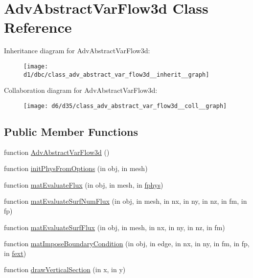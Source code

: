 \hypertarget{class_adv_abstract_var_flow3d}{}\section{Adv\+Abstract\+Var\+Flow3d Class Reference}
\label{class_adv_abstract_var_flow3d}


Inheritance diagram for Adv\+Abstract\+Var\+Flow3d\+:
\nopagebreak
\begin{figure}[H]
\begin{center}
\leavevmode
\texttt{[image: d1/dbc/class\_adv\_abstract\_var\_flow3d\_\_inherit\_\_graph]}
\end{center}
\end{figure}


Collaboration diagram for Adv\+Abstract\+Var\+Flow3d\+:
\nopagebreak
\begin{figure}[H]
\begin{center}
\leavevmode
\texttt{[image: d6/d35/class\_adv\_abstract\_var\_flow3d\_\_coll\_\_graph]}
\end{center}
\end{figure}
\subsection*{Public Member Functions}
\begin{DoxyCompactItemize}
\item 
function \hyperlink{class_adv_abstract_var_flow3d_aa5e5f21952f1cd7a2006cd55a5c87f6a}{Adv\+Abstract\+Var\+Flow3d} ()
\item 
function \hyperlink{class_adv_abstract_var_flow3d_ab30211bfc272c7a3f25f0a3fe755edfd}{init\+Phys\+From\+Options} (in obj, in mesh)
\item 
function \hyperlink{class_adv_abstract_var_flow3d_ac20011b55e276c0b317d0ae22a097131}{mat\+Evaluate\+Flux} (in obj, in mesh, in \hyperlink{class_ndg_phys_a6b25724fc9474d32018439009072f0a9}{fphys})
\item 
function \hyperlink{class_adv_abstract_var_flow3d_a08e3d72100586b764ab437d8333be2ba}{mat\+Evaluate\+Surf\+Num\+Flux} (in obj, in mesh, in nx, in ny, in nz, in fm, in fp)
\item 
function \hyperlink{class_adv_abstract_var_flow3d_a360b4ee85fd66bb70959b5e939842d6c}{mat\+Evaluate\+Surf\+Flux} (in obj, in mesh, in nx, in ny, in nz, in fm)
\item 
function \hyperlink{class_adv_abstract_var_flow3d_a4e7799c86586415162c2fa86039bf506}{mat\+Impose\+Boundary\+Condition} (in obj, in edge, in nx, in ny, in fm, in fp, in \hyperlink{class_ndg_phys_mat_a2b0e8a77bf5f6fe870b12e400d6d83f3}{fext})
\item 
function \hyperlink{class_adv_abstract_var_flow3d_ada60228e747318b6e71b4cfd3221d7a9}{draw\+Vertical\+Section} (in x, in y)
\end{DoxyCompactItemize}
